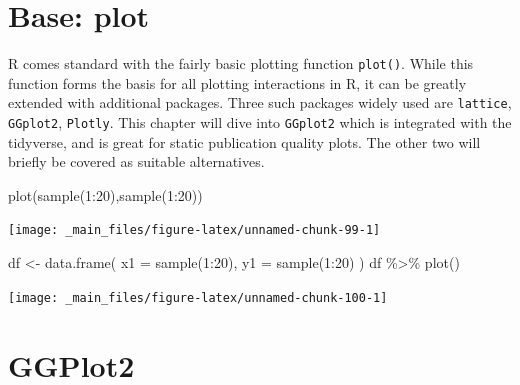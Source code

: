 \documentclass[
]{book}
\newenvironment{Shaded}{\begin{snugshade}}{\end{snugshade}}
\newcommand{\AttributeTok}[1]{\textcolor[rgb]{0.77,0.63,0.00}{#1}}
\newcommand{\DecValTok}[1]{\textcolor[rgb]{0.00,0.00,0.81}{#1}}
\newcommand{\FunctionTok}[1]{\textcolor[rgb]{0.00,0.00,0.00}{#1}}
\newcommand{\NormalTok}[1]{#1}
\newcommand{\OtherTok}[1]{\textcolor[rgb]{0.56,0.35,0.01}{#1}}
\newcommand{\SpecialCharTok}[1]{\textcolor[rgb]{0.00,0.00,0.00}{#1}}
\begin{document}
\hypertarget{base-plot}{%
\section{Base: plot}\label{base-plot}}

R comes standard with the fairly basic plotting function \texttt{plot()}. While this function forms the basis for all plotting interactions in R, it can be greatly extended with additional packages. Three such packages widely used are \texttt{lattice}, \texttt{GGplot2}, \texttt{Plotly}. This chapter will dive into \texttt{GGplot2} which is integrated with the tidyverse, and is great for static publication quality plots. The other two will briefly be covered as suitable alternatives.

\begin{Shaded}
\begin{Highlighting}[]
\FunctionTok{plot}\NormalTok{(}\FunctionTok{sample}\NormalTok{(}\DecValTok{1}\SpecialCharTok{:}\DecValTok{20}\NormalTok{),}\FunctionTok{sample}\NormalTok{(}\DecValTok{1}\SpecialCharTok{:}\DecValTok{20}\NormalTok{))}
\end{Highlighting}
\end{Shaded}

\begin{center}\texttt{[image: \_main\_files/figure-latex/unnamed-chunk-99-1]} \end{center}

\begin{Shaded}
\begin{Highlighting}[]
\NormalTok{df }\OtherTok{\textless{}{-}} \FunctionTok{data.frame}\NormalTok{( }\AttributeTok{x1 =} \FunctionTok{sample}\NormalTok{(}\DecValTok{1}\SpecialCharTok{:}\DecValTok{20}\NormalTok{), }\AttributeTok{y1 =} \FunctionTok{sample}\NormalTok{(}\DecValTok{1}\SpecialCharTok{:}\DecValTok{20}\NormalTok{) )}
\NormalTok{df }\SpecialCharTok{\%\textgreater{}\%} \FunctionTok{plot}\NormalTok{()}
\end{Highlighting}
\end{Shaded}

\begin{center}\texttt{[image: \_main\_files/figure-latex/unnamed-chunk-100-1]} \end{center}

\hypertarget{ggplot2-1}{%
\section{GGPlot2}\label{ggplot2-1}}
\end{document}
